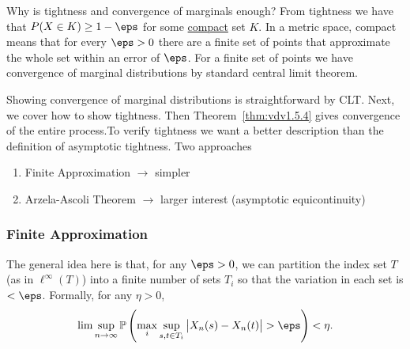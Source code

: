 
\begin{remark*}[Intuition]
	Why is tightness and convergence of marginals enough? From tightness we have that \(P(X\in K) \geq 1-\eps\) for some \underline{compact} set \(K\). In a metric space, compact means that for every \(\eps>0\) there are a finite set of points that approximate the whole set within an error of \(\eps\). For a finite set of points we have convergence of marginal distributions by standard central limit theorem.
\end{remark*}

Showing convergence of marginal distributions is straightforward by CLT. Next, we cover how to show tightness. Then Theorem~\ref{thm:vdv1.5.4} gives convergence of the entire process.To verify tightness we want a better description than the definition of asymptotic tightness. Two approaches
\begin{enumerate}
	\item Finite Approximation \(\to\) simpler
	\item Arzela-Ascoli Theorem \(\to\)  larger interest (asymptotic equicontinuity)
\end{enumerate}

\subsubsection{Finite Approximation}

The general idea here is that, for any \(\eps > 0\), we can partition the index set \(T\) (as in \(\ell^\infty(T)\)) into a finite number of sets \(T_i\) so that the variation in each set is  \(< \eps\). Formally, for any \(\eta > 0\),
\[
	 \lim\sup_{n\to\infty} \P\left(\max_i \sup_{s,t\in T_i}\left|X_n(s)-X_n(t)\right|>\eps\right)<\eta
.\]

